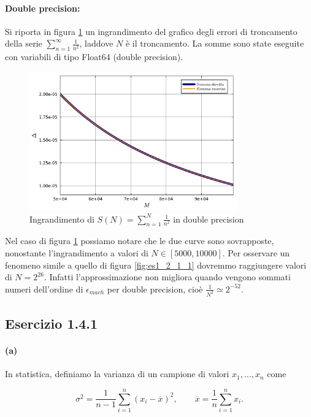 \documentclass[letterpaper, 12pt]{article}
\begin{document}
\paragraph{Double precision:}

Si riporta in figura \ref{fig:es1_2_1_2} un ingrandimento del grafico degli errori di troncamento della serie 
$\sum_{n=1}^\infty \frac{1}{n^2}$, laddove $N$ è il troncamento. La somme sono state eseguite
con variabili di tipo Float64 (double precision).

\begin{figure}[ht!]
    \centering
    \includegraphics[width=0.8\textwidth]{1212.pdf}
    \caption{Ingrandimento di $S(N)=\sum_{n=1}^N \frac{1}{n^2}$ in double precision}
    \label{fig:es1_2_1_2}
\end{figure}

Nel caso di figura \ref{fig:es1_2_1_2} possiamo notare che le due curve sono sovrapposte, nonostante l'ingrandimento a 
valori di $N \in [5000, 10000]$. Per osservare un fenomeno simile a quello di 
figura \ref{fig:es1_2_1_1} dovremmo raggiungere valori di $N = 2^{26}$. Infatti l'approssimazione non migliora
quando vengono sommati numeri dell'ordine di $\epsilon_{mach}$ per double precision, cioè
 $\frac{1}{N^2} \simeq 2^{-52}$.

\subsection{Esercizio 1.4.1}
\paragraph{(a)} In statistica, definiamo la varianza di un campione di valori $x_1,\ldots,x_n$ come

\begin{equation}
    \sigma^2 = \frac{1}{n-1} \sum_{i=1}^n (x_i - \overline{x})^2,
    \qquad 
    \overline{x} = \frac{1}{n} \sum_{i=1}^n x_i.
    \label{eq:varianza_naive}
\end{equation}
\end{document}
